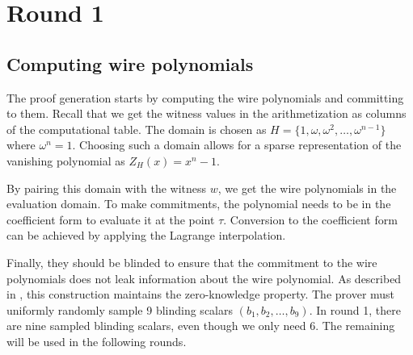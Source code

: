 \section{Round 1}
\label{chap:round1}


\subsection{Computing wire polynomials}

The proof generation starts by computing the wire polynomials and committing to them. Recall that we get the witness values in the arithmetization as columns of the computational table. The domain is chosen as $H = \{1, \omega, \omega^2, \ldots, \omega^{n-1}\}$ where $\omega^n = 1$. Choosing such a domain allows for a sparse representation of the vanishing polynomial as $Z_H(x) = x^n -1$.

By pairing this domain with the witness $w$, we get the wire polynomials in the evaluation domain. To make commitments, the polynomial needs to be in the coefficient form to evaluate it at the point $\tau$. Conversion to the coefficient form can be achieved by applying the Lagrange interpolation.

Finally, they should be blinded to ensure that the commitment to the wire polynomials does not leak information about the wire polynomial. As described in , this construction maintains the zero-knowledge property. The prover must uniformly randomly sample 9 blinding scalars $(b_1, b_2, \ldots, b_9)$. In round 1, there are nine sampled blinding scalars, even though we only need 6. The remaining will be used in the following rounds.


